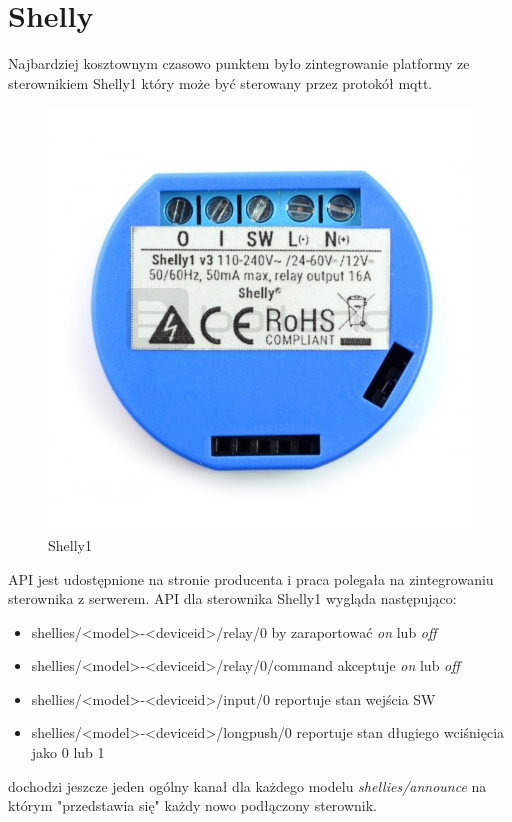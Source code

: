 \section{Shelly}
Najbardziej kosztownym czasowo punktem było zintegrowanie platformy ze sterownikiem Shelly1 który może być sterowany przez protokół mqtt. \cite{mqtt, shelly}
\begin{figure}[h]
  \centering
  \includegraphics[width=\linewidth/2]{shelly1.jpg}
  \caption{Shelly1}
  \label{fig:shelly}
\end{figure}
API jest udostępnione na stronie producenta i praca polegała na zintegrowaniu sterownika z serwerem.
API dla sterownika Shelly1 wygląda następująco:
\begin{itemize}
    \item shellies/<model>-<deviceid>/relay/0 by zaraportować \textit{on} lub \textit{off}
    \item shellies/<model>-<deviceid>/relay/0/command akceptuje \textit{on} lub \textit{off}
    \item shellies/<model>-<deviceid>/input/0 reportuje stan wejścia SW
    \item shellies/<model>-<deviceid>/longpush/0 reportuje stan długiego wciśnięcia jako 0 lub 1
\end{itemize}
dochodzi jeszcze jeden ogólny kanał dla każdego modelu \textit{shellies/announce} na którym "przedstawia się" każdy nowo podłączony sterownik.
